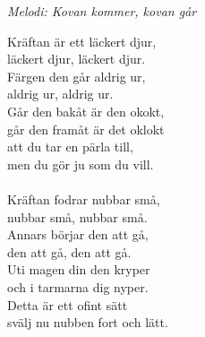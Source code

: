 {\footnotesize\textit{Melodi: Kovan kommer, kovan går}}\par
\vspace{10pt}
Kräftan är ett läckert djur,\\
läckert djur, läckert djur.\\
Färgen den går aldrig ur,\\
aldrig ur, aldrig ur.\\
Går den bakåt är den okokt,\\
går den framåt är det oklokt\\
att du tar en pärla till,\\
men du gör ju som du vill.\\
\\
Kräftan fodrar nubbar små,\\
nubbar små, nubbar små.\\
Annars börjar den att gå,\\
den att gå, den att gå.\\
Uti magen din den kryper\\
och i tarmarna dig nyper.\\
Detta är ett ofint sätt\\
svälj nu nubben fort och lätt.
